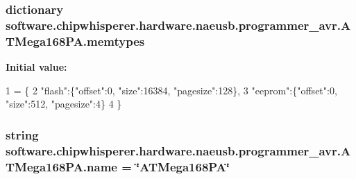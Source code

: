 \subsubsection[{memtypes}]{\setlength{\rightskip}{0pt plus 5cm}dictionary software.\+chipwhisperer.\+hardware.\+naeusb.\+programmer\+\_\+avr.\+A\+T\+Mega168\+P\+A.\+memtypes\hspace{0.3cm}{\ttfamily [static]}}\label{classsoftware_1_1chipwhisperer_1_1hardware_1_1naeusb_1_1programmer__avr_1_1ATMega168PA_a6446da65abe27256f7dfad3710f840ac}
{\bfseries Initial value\+:}
\begin{DoxyCode}
1 = \{
2        \textcolor{stringliteral}{"flash"}:\{\textcolor{stringliteral}{"offset"}:0, \textcolor{stringliteral}{"size"}:16384, \textcolor{stringliteral}{"pagesize"}:128\},
3        \textcolor{stringliteral}{"eeprom"}:\{\textcolor{stringliteral}{"offset"}:0, \textcolor{stringliteral}{"size"}:512, \textcolor{stringliteral}{"pagesize"}:4\}
4      \}
\end{DoxyCode}
\hypertarget{classsoftware_1_1chipwhisperer_1_1hardware_1_1naeusb_1_1programmer__avr_1_1ATMega168PA_ad293db3b69fc4d8f71350a657039bfa2}{}
\subsubsection[{name}]{\setlength{\rightskip}{0pt plus 5cm}string software.\+chipwhisperer.\+hardware.\+naeusb.\+programmer\+\_\+avr.\+A\+T\+Mega168\+P\+A.\+name = \char`\"{}A\+T\+Mega168\+P\+A\char`\"{}\hspace{0.3cm}{\ttfamily [static]}}\label{classsoftware_1_1chipwhisperer_1_1hardware_1_1naeusb_1_1programmer__avr_1_1ATMega168PA_ad293db3b69fc4d8f71350a657039bfa2}
\hypertarget{classsoftware_1_1chipwhisperer_1_1hardware_1_1naeusb_1_1programmer__avr_1_1ATMega168PA_a15680bfcabb39c2127f878eb436594be}{}
